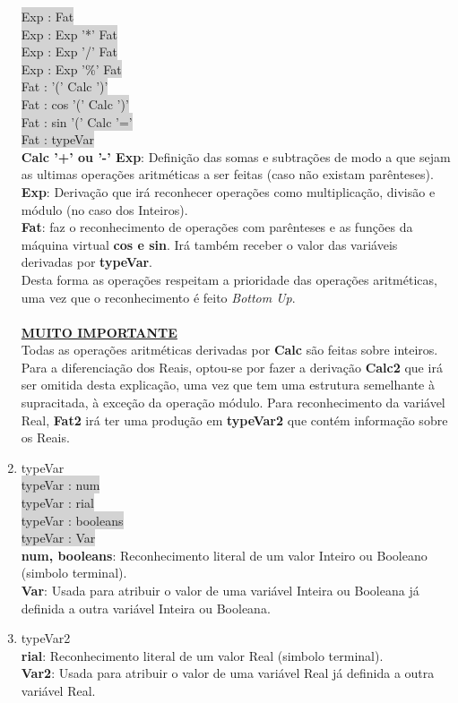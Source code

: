 \documentclass{report}
\begin{document}
\begin{enumerate}
\colorbox{lightgray}{Exp : Fat}\\
\colorbox{lightgray}{Exp : Exp '*' Fat}\\
\colorbox{lightgray}{Exp : Exp '/' Fat}\\
\colorbox{lightgray}{Exp : Exp '\%' Fat}\\

\colorbox{lightgray}{Fat : '(' Calc ')'}\\
\colorbox{lightgray}{Fat : cos '(' Calc ')'}\\
\colorbox{lightgray}{Fat : sin '(' Calc '='}\\
\colorbox{lightgray}{Fat : typeVar}\\
\textbf{Calc '+' ou '-' Exp}: Definição das somas e subtrações de modo a que sejam as ultimas operações aritméticas a ser feitas (caso não existam parênteses).\\
\textbf{Exp}: Derivação que irá reconhecer operações como multiplicação, divisão e módulo (no caso dos Inteiros).\\
\textbf{Fat}: faz o reconhecimento de operações com parênteses e as funções da máquina virtual \textbf{cos e sin}. Irá também receber o valor das variáveis derivadas por \textbf{typeVar}.\\
Desta forma as operações respeitam a prioridade das operações aritméticas, uma vez que o reconhecimento é feito \textit{Bottom Up}.\\\\
\textbf{\underline{MUITO IMPORTANTE}}\\
Todas as operações aritméticas derivadas por \textbf{Calc} são feitas sobre inteiros. Para a diferenciação dos Reais, optou-se por fazer a derivação \textbf{Calc2} que irá ser omitida desta explicação, uma vez que tem uma estrutura semelhante à supracitada, à exceção da operação módulo. Para reconhecimento da variável Real, \textbf{Fat2} irá ter uma produção em \textbf{typeVar2} que contém informação sobre os Reais.


\item{typeVar}\\
\colorbox{lightgray}{typeVar : num}\\
\colorbox{lightgray}{typeVar : rial}\\
\colorbox{lightgray}{typeVar : booleans}\\
\colorbox{lightgray}{typeVar : Var}\\
\textbf{num, booleans}: Reconhecimento literal de um valor Inteiro ou Booleano (simbolo terminal).\\
\textbf{Var}: Usada para atribuir o valor de uma variável Inteira ou Booleana já definida a outra variável Inteira ou Booleana.\\

\item{typeVar2}\\
\textbf{rial}: Reconhecimento literal de um valor Real (simbolo terminal).\\
\textbf{Var2}: Usada para atribuir o valor de uma variável Real já definida a outra variável Real.\\
\end{enumerate}
\end{document}
